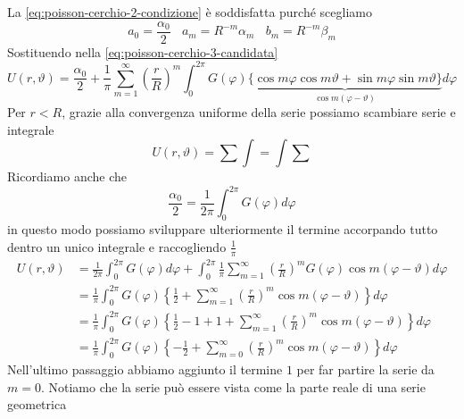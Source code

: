 \documentclass[10pt,a4paper,twoside,openright]{book}
\begin{document}
\begin{dimostrazione}
    La \eqref{eq:poisson-cerchio-2-condizione} è soddisfatta purché scegliamo
    \begin{equation*}
        a_{0} =\frac{\alpha _{0}}{2} \ \ \ \ a_{m} =R^{-m} \alpha _{m} \ \ \ \ b_{m} =R^{-m} \beta _{m}
    \end{equation*}
    Sostituendo nella \eqref{eq:poisson-cerchio-3-candidata}
    \begin{equation*}
        U(r,\vartheta) =\frac{\alpha _{0}}{2} +\frac{1}{\pi }\sum\limits ^{\infty }_{m=1}\left(\frac{r}{R}\right)^{m}\int ^{2\pi }_{0} G(\varphi)\underbrace{\{\cos m\varphi \cos m\vartheta +\sin m\varphi \sin m\vartheta \}}_{\cos m(\varphi -\vartheta)} d\varphi
    \end{equation*}
    Per $r< R$, grazie alla convergenza uniforme della serie possiamo scambiare serie e integrale
    \begin{equation*}
        U(r,\vartheta) =\sum \int =\int \sum
    \end{equation*}
    Ricordiamo anche che
    \begin{equation*}
        \frac{\alpha _{0}}{2} =\frac{1}{2\pi }\int ^{2\pi }_{0} G(\varphi) d\varphi
    \end{equation*}
    in questo modo possiamo sviluppare ulteriormente il termine accorpando tutto dentro un unico integrale e raccogliendo $\frac{1}{\pi }$
    \begin{align}
        U(r,\vartheta) & =\frac{1}{2\pi }\int ^{2\pi }_{0} G(\varphi) d\varphi +\int ^{2\pi }_{0}\frac{1}{\pi }\sum\limits ^{\infty }_{m=1}\left(\frac{r}{R}\right)^{m} G(\varphi)\cos m(\varphi -\vartheta) d\varphi \nonumber \\
                       & =\frac{1}{\pi }\int ^{2\pi }_{0} G(\varphi)\left\{\frac{1}{2} +\sum\limits ^{\infty }_{m=1}\left(\frac{r}{R}\right)^{m}\cos m(\varphi -\vartheta)\right\} d\varphi \nonumber                           \\
                       & =\frac{1}{\pi }\int ^{2\pi }_{0} G(\varphi)\left\{\frac{1}{2} -1+1+\sum\limits ^{\infty }_{m=1}\left(\frac{r}{R}\right)^{m}\cos m(\varphi -\vartheta)\right\} d\varphi \nonumber                       \\
                       & =\frac{1}{\pi }\int ^{2\pi }_{0} G(\varphi)\left\{-\frac{1}{2} +\sum\limits ^{\infty }_{m=0}\left(\frac{r}{R}\right)^{m}\cos m(\varphi -\vartheta)\right\} d\varphi \label{eq:poisson-cerchio-1}
    \end{align}
    Nell'ultimo passaggio abbiamo aggiunto il termine $1$ per far partire la serie da $m=0$. Notiamo che la serie può essere vista come la parte reale di una serie geometrica

\end{dimostrazione}
\end{document}
